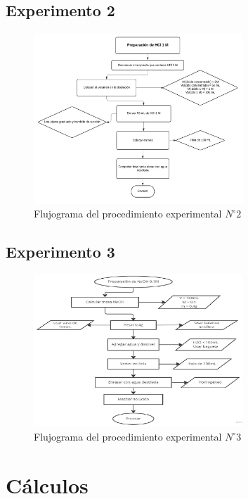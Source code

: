 \documentclass[11pt]{scrartcl}
\begin{document}
\subsection{Experimento 2}
\begin{figure}[H]
	\caption{Flujograma del procedimiento experimental $N^{\circ} 2$}
\begin{center}
\includegraphics[width=0.7\textwidth]{diagramaexp2.jpg}
\end{center}
\end{figure}

\subsection{Experimento 3}

\begin{figure}[H]
	\caption{Flujograma del procedimiento experimental $N^{\circ} 3$}
\begin{center}
\includegraphics[width=0.7\textwidth]{2023_06_07_d6ea23c48f19fc3f50b0g-07(1)}
\end{center}
\end{figure}

\section{C\'alculos}
\end{document}
